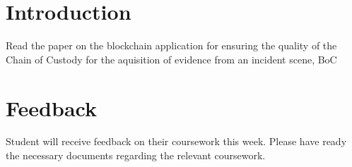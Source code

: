 \documentclass{article}
\begin{document}
\section{Introduction}
Read the paper on the blockchain application for ensuring the quality of the Chain of Custody for the aquisition of evidence from an incident scene, BoC \cite{mitchell:2019c}

\section{Feedback}
Student will receive feedback on their coursework this week. Please have ready the necessary documents regarding the relevant coursework.
\end{document}
